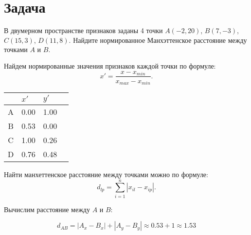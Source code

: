 \documentclass[12pt,a4paper]{article}
\begin{document}
\section{Задача}

В двумерном пространстве признаков заданы 4 точки $A(-2, 20)$, $B(7, -3)$, $C(15, 3)$, $D(11, 8)$.
Найдите нормированное Манхэттенское расстояние между точками $A$ и $B$.

Найдем нормированные значения признаков каждой точки по формуле: 
\[  x' = \dfrac{x-x_{min}}{x_{max} - x_{min}}. \]

\begin{center}
  \begin{tabular}{|c|l|l|l|}
    \hline
      & $x'$ & $y'$ \\\hline
    A & 0.00 & 1.00 \\\hline
    B & 0.53 & 0.00 \\\hline
    C & 1.00 & 0.26 \\\hline
    D & 0.76 & 0.48 \\\hline
  \end{tabular}
\end{center}

Найти манхеттенское расстояние между точками можно по формуле:
\[ d_{lp} = \sum_{i=1}^{n} \left| x_{il} - x_{ip} \right|. \]

Вычислим расстояние между $A$ и $B$:

\[ d_{AB} = |A_x - B_x| + |A_y - B_y| \approx 0.53 + 1 \approx 1.53 \]
\end{document}
